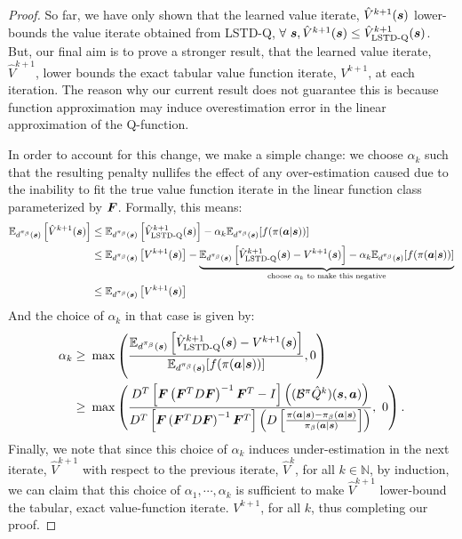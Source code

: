 \begin{proof}
So far, we have only shown that the learned value iterate, $\hat{V}^{k+1}(\boldsymbol{s})$ lower-bounds the value iterate obtained from LSTD-Q, $\forall ~\boldsymbol{s}, \hat{V}^{k+1}(\boldsymbol{s}) \leq \hat{V}^{k+1}_{\text{LSTD-Q}}(\boldsymbol{s})$. But, our final aim is to prove a stronger result, that the learned value iterate, $\hat{V}^{k+1}$, lower bounds the exact tabular value function iterate, ${V}^{k+1}$, at each iteration. The reason why our current result does not guarantee this is because function approximation may induce overestimation error in the linear approximation of the Q-function.

In order to account for this change, we make a simple change: we choose $\alpha_k$ such that the resulting penalty nullifes the effect of any over-estimation caused due to the inability to fit the true value function iterate in the linear function class parameterized by $\boldsymbol{F}$. Formally, this means:
\begin{align*}
    \mathbb{E}_{d^{\pi_\beta}(\boldsymbol{s})}\left[\hat{V}^{k+1}(\boldsymbol{s})\right] &\leq \mathbb{E}_{d^{\pi_\beta}(\boldsymbol{s})}\left[\hat{V}^{k+1}_{\text{LSTD-Q}}(\boldsymbol{s})\right] - \alpha_k \mathbb{E}_{d^{\pi_\beta}(\boldsymbol{s})}[f(\pi(\boldsymbol{a}|\boldsymbol{s}))] \\
    & \leq \mathbb{E}_{d^{\pi_\beta}(\boldsymbol{s})}\left[V^{k+1}(\boldsymbol{s})\right] - \underbrace{\mathbb{E}_{d^{\pi_\beta}(\boldsymbol{s})}\left[\hat{V}^{k+1}_{\text{LSTD-Q}}(\boldsymbol{s}) - V^{k+1}(\boldsymbol{s}) \right] - \alpha_k \mathbb{E}_{d^{\pi_\beta}(\boldsymbol{s})}[f(\pi(\boldsymbol{a}|\boldsymbol{s}))]}_{\text{choose~} \alpha_k \text{~to make this negative}} \\
    & \leq \mathbb{E}_{d^{\pi_\beta}(\boldsymbol{s})}\left[V^{k+1}(\boldsymbol{s})\right]
\end{align*}
And the choice of $\alpha_k$ in that case is given by:
\begin{align*}
    \alpha_k \geq& ~ \max \left(\frac{\mathbb{E}_{d^{\pi_\beta}(\boldsymbol{s})}\left[\hat{V}^{k+1}_{\text{LSTD-Q}}(\boldsymbol{s}) - V^{k+1}(\boldsymbol{s}) \right]}{\mathbb{E}_{d^{\pi_\beta}(\boldsymbol{s})}[f(\pi(\boldsymbol{a}|\boldsymbol{s}))]}, 0 \right)\\
    \geq& ~ \max \left(\frac{D^T\left[\boldsymbol{F} \left(\boldsymbol{F}^T D \boldsymbol{F} \right)^{-1} \boldsymbol{F}^T - I \right]\left((\mathcal{B}^\pi \hat{Q}^k)(\boldsymbol{s}, \boldsymbol{a})\right)}{D^T\left[ \boldsymbol{F} \left(\boldsymbol{F}^T D \boldsymbol{F} \right)^{-1} \boldsymbol{F}^T \right] \left(D \left[\frac{\pi(\boldsymbol{a}|\boldsymbol{s}) - {\pi_\beta}(\boldsymbol{a}|\boldsymbol{s})}{{\pi_\beta}(\boldsymbol{a}|\boldsymbol{s})} \right] \right)},~ 0 \right).
\end{align*}
Finally, we note that since this choice of $\alpha_k$ induces under-estimation in the next iterate, $\hat{V}^{k+1}$ with respect to the previous iterate, $\hat{V}^k$, for all $k \in \mathbb{N}$, by induction, we can claim that this choice of $\alpha_1, \cdots, \alpha_k$ is sufficient to make $\hat{V}^{k+1}$ lower-bound the tabular, exact value-function iterate. $V^{k+1}$, for all $k$, thus completing our proof.
\end{proof}

